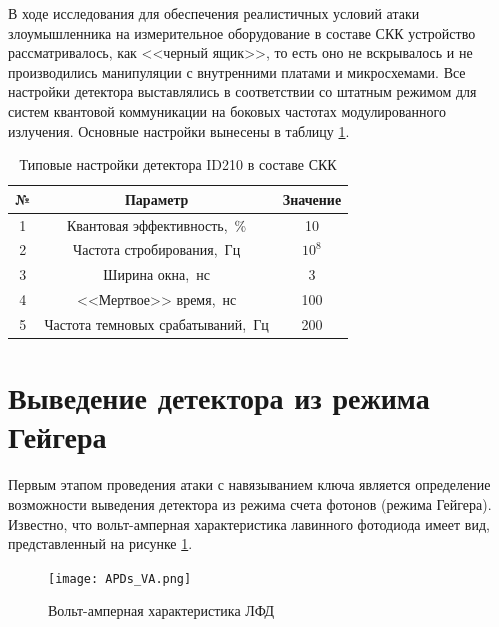 В ходе исследования для обеспечения реалистичных условий атаки злоумышленника на измерительное оборудование в составе СКК устройство рассматривалось, как <<черный ящик>>, то есть оно не вскрывалось и не производились манипуляции с внутренними платами и микросхемами. Все настройки детектора выставлялись в соответствии со штатным режимом для систем квантовой коммуникации на боковых частотах модулированного излучения. Основные настройки вынесены в таблицу \ref{tab:ID210_setups}.  




\begin{table} 
	\centering
	\caption{Типовые настройки детектора ID210 в составе СКК}
	\label{tab:ID210_setups}
		\begin{tabular}{|c|c|c|}
			\hline
				№  				& Параметр    				 & Значение     \\
			\hline
				1 				& Квантовая эффективность,~\% 	 & 10 		 \\
			\hline 

				2 				& Частота стробирования,~Гц 		 & $10^8$   \\
			\hline

				3 				& Ширина окна,~нс & 3 	     \\
			\hline

				4 				& <<Мертвое>> время,~нс  & 100 		  \\
			\hline

				5 				& Частота темновых срабатываний,~Гц & 200 		  \\

			\hline
		\end{tabular}
\end{table}





\section{Выведение детектора из режима Гейгера} \label{sec:ch2/sec2}

Первым этапом проведения атаки с навязыванием ключа является определение возможности выведения детектора из режима счета фотонов (режима Гейгера). Известно, что вольт-амперная характеристика лавинного фотодиода имеет вид, представленный на рисунке \ref{fig:APDs_VA}.    

 \begin{figure}[ht]
  \centering
  \texttt{[image: APDs\_VA.png]}
  \caption{Вольт-амперная характеристика ЛФД}
  \label{fig:APDs_VA}
\end{figure}


